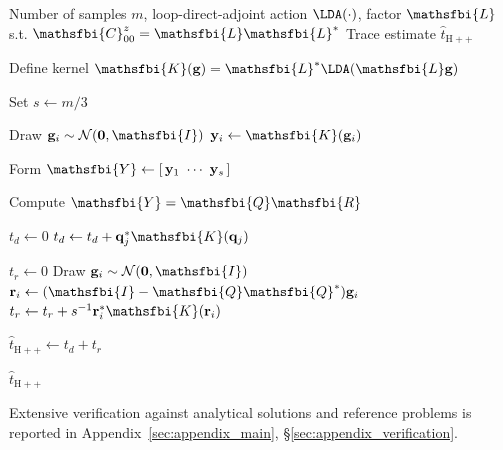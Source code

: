 \begin{algorithm}[t]
  \caption{Stochastic stepping trace estimator for \(\tr\left\{\mathsfbi{T}\mathsfbi{C}_{00}^{z}\right\}\)}
  \label{alg:stochastic_stepping_trace_estimator}

  \begin{algorithmic}[1]
    \Require Number of samples \(m\), loop-direct-adjoint action \(\LDA(\cdot)\),
             factor \(\mathsfbi{L}\) s.t.
             \(\mathsfbi{C}_{00}^{z}=\mathsfbi{L}\mathsfbi{L}^{*}\)
    \Ensure Trace estimate \(\widehat{t}_{\mathrm{H++}}\)

    \State Define kernel
      \(\mathsfbi{K}(\mathbf{g})
      =
      \mathsfbi{L}^{*}\LDA(\mathsfbi{L}\mathbf{g})\)

    \State Set \(s \gets m/3\)

      \State Draw \(\mathbf{g}_i \sim \mathcal{N}(\mathbf{0},\mathsfbi{I})\)
      \State \(\mathbf{y}_i \gets \mathsfbi{K}(\mathbf{g}_i)\)
    \EndFor

    \State Form
      \(\mathsfbi{Y}
      \gets
      [\,\mathbf{y}_1\ \cdots\ \mathbf{y}_s\,]\)

    \State Compute
      \(\mathsfbi{Y}=\mathsfbi{Q}\mathsfbi{R}\)

    \State \(t_d \gets 0\)
      \State \(t_d \gets t_d + \mathbf{q}_j^{*}\mathsfbi{K}(\mathbf{q}_j)\)
    \EndFor

    \State \(t_r \gets 0\)
      \State Draw \(\mathbf{g}_i \sim \mathcal{N}(\mathbf{0},\mathsfbi{I})\)
      \State \(\mathbf{r}_i \gets (\mathsfbi{I}-\mathsfbi{Q}\mathsfbi{Q}^{*})\mathbf{g}_i\)
      \State \(t_r \gets t_r + s^{-1}\mathbf{r}_i^{*}\mathsfbi{K}(\mathbf{r}_i)\)
    \EndFor

    \State \(\widehat{t}_{\mathrm{H++}} \gets t_d+t_r\)

    \State \Return \(\widehat{t}_{\mathrm{H++}}\)
  \end{algorithmic}
\end{algorithm}
Extensive verification against analytical solutions and reference problems is reported in Appendix~\ref{sec:appendix_main}, \S\ref{sec:appendix_verification}.
